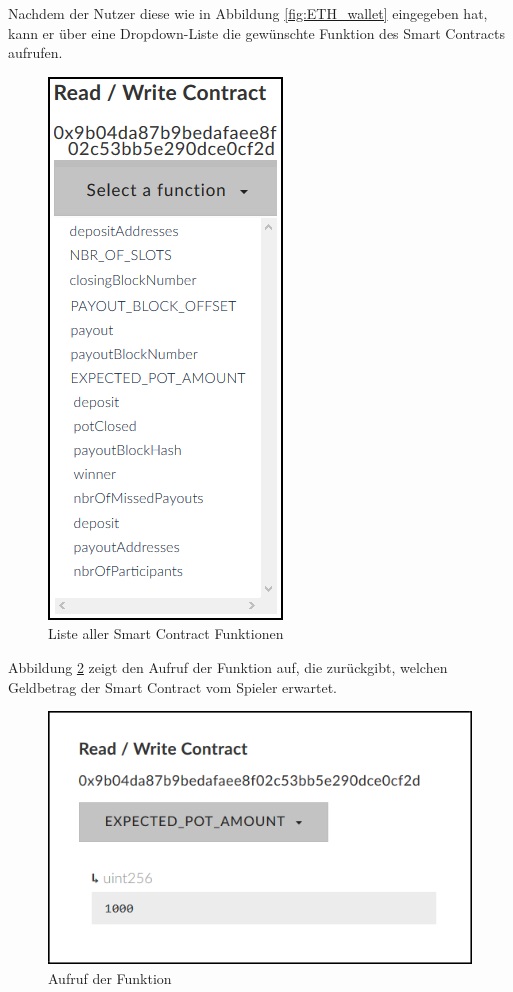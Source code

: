 Nachdem der Nutzer diese wie in Abbildung \ref{fig:ETH_wallet} eingegeben hat, kann er über eine Dropdown-Liste die gewünschte Funktion des Smart Contracts aufrufen.


\begin{figure}[H]
\centering
\includegraphics[scale=0.85]{Figures/eth_gui/ETH_wallet_contract_functions}
\decoRule
\caption{Liste aller Smart Contract Funktionen}
\label{fig:ETH_wallet_contract_functions}
\end{figure}

Abbildung \ref{fig:ETH_wallet_expected_amount} zeigt den Aufruf der Funktion auf, die zurückgibt, welchen Geldbetrag der Smart Contract vom Spieler erwartet.

\begin{figure}[H]
\centering
\includegraphics[scale=0.85]{Figures/eth_gui/ETH_wallet_expected_amount}
\decoRule
\caption{Aufruf der  Funktion}
\label{fig:ETH_wallet_expected_amount}
\end{figure}

